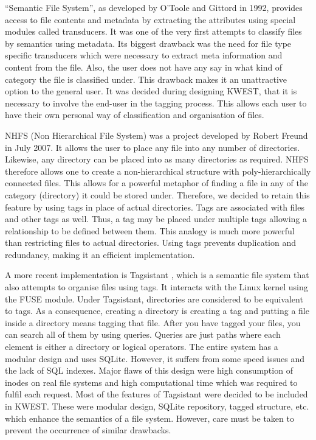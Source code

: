 ``Semantic File System''\cite{SEMFS}, as developed by O'Toole and Gittord in 1992, provides
access to file contents and metadata by extracting the attributes using special modules
called transducers. It was one of the very first attempts to classify files by semantics
using metadata. Its biggest drawback was the need for file type specific transducers
which were necessary to extract meta information and content from the file. Also, the
user does not have any say in what kind of category the file is classified under. This
drawback makes it an unattractive option to the general user. It was decided during
designing KWEST, that it is necessary to involve the end-user in the tagging process. This
allows each user to have their own personal way of classification and organisation of
files.

NHFS (Non Hierarchical File System)\cite{NHFS} was a project developed by Robert Freund
in July 2007. It allows the user to place any file into any number of directories. Likewise,
any directory can be placed into as many directories as required. NHFS therefore allows
one to create a non-hierarchical structure with poly-hierarchically connected files. This
allows for a powerful metaphor of finding a file in any of the category (directory) it could
be stored under. Therefore, we decided to retain this feature by using tags in place of
actual directories. Tags are associated with files and other tags as well. Thus, a tag may
be placed under multiple tags allowing a relationship to be defined between them. This
analogy is much more powerful than restricting files to actual directories. Using tags
prevents duplication and redundancy, making it an efficient implementation.

A more recent implementation is Tagsistant\cite{TAGSISTANT} , which is a semantic file system that
also attempts to organise files using tags. It interacts with the Linux kernel using the
FUSE module. Under Tagsistant, directories are considered to be equivalent to tags. As
a consequence, creating a directory is creating a tag and putting a file inside a directory
means tagging that file. After you have tagged your files, you can search all of them by
using queries. Queries are just paths where each element is either a directory or logical
operators. The entire system has a modular design and uses SQLite. However, it suffers
from some speed issues and the lack of SQL indexes. Major flaws of this design were
high consumption of inodes on real file systems and high computational time which was
required to fulfil each request. Most of the features of Tagsistant were decided to be
included in KWEST. These were modular design, SQLite repository, tagged structure, etc.
which enhance the semantics of a file system. However, care must be taken to prevent
the occurrence of similar drawbacks.


